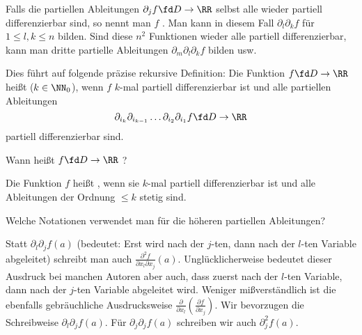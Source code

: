 \begin{antwort}
  Falls die partiellen Ableitungen $\partial_j f \fd D \to \RR$ selbst 
  alle wieder partiell differenzierbar sind, so nennt man $f$ 
  . Man kann in diesem Fall 
  $\partial_l \partial_k f$ für $1 \le l,k \le n$ bilden. Sind diese 
  $n^2$ Funktionen wieder alle partiell differenzierbar, kann man 
  dritte partielle Ableitungen $\partial_m \partial_l \partial_k f$ 
  bilden usw. 

  Dies führt auf folgende präzise rekursive Definition: Die Funktion  
  $f\fd D\to \RR$ heißt  
  ($k\in \NN_0$), wenn $f$ $k$-mal partiell differenzierbar ist und alle 
  partiellen Ableitungen 
  \[
  \partial_{i_k}\partial_{i_{k-1}} \ldots \partial_{i_2}\partial_{i_1} f \fd 
  D \to \RR
  \]
  partiell differenzierbar sind. \AntEnd
\end{antwort}

\begin{frage}
  Wann heißt $f\fd D\to \RR$ ?
\end{frage}

\begin{antwort}
  Die Funktion $f$ heißt 
  , wenn 
  sie $k$-mal partiell differenzierbar ist und alle Ableitungen 
  der Ordnung $\le k$ stetig sind. \AntEnd 
\end{antwort}

\begin{frage}
  Welche Notationen verwendet man für die höheren partiellen Ableitungen?
\end{frage}

\begin{antwort}
  Statt $\partial_l \partial_j f(a)$ 
  (bedeutet: Erst wird nach der $j$-ten, dann nach der $l$-ten Variable 
  abgeleitet) schreibt man auch 
  $\frac{\partial^2 f }{ \partial x_l \partial x_j }(a)$. Unglücklicherweise 
  bedeutet dieser Ausdruck bei manchen Autoren aber auch, dass 
  zuerst nach der $l$-ten Variable, dann nach der $j$-ten Variable abgeleitet 
  wird. Weniger mißverständlich ist die ebenfalls gebräuchliche Ausdrucksweise 
  $\frac{\partial}{\partial x_l}
  \left( \frac{\partial f }{\partial x_j }\right).
  $ Wir bevorzugen die Schreibweise $\partial_l \partial_j f(a)$. Für 
  $\partial_j \partial_j f(a)$ schreiben wir auch $\partial_j^2 f(a)$.
  \AntEnd
\end{antwort}

